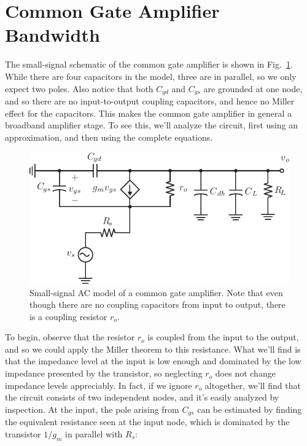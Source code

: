 \section{Common Gate Amplifier Bandwidth}
The small-signal schematic of the common gate amplifier is shown in Fig.~\ref{fig:cg_amp_caps}. While there are four capacitors in the model, three are in parallel, so we only expect two poles.  Also notice that both $C_{gd}$ and $C_{gs}$ are grounded at one node, and so there are no input-to-output coupling capacitors, and hence no Miller effect for the capacitors.  This makes the common gate amplifier in general a broadband amplifier stage.  To see this, we'll analyze the circuit, first using an approximation, and then using the complete equations.  
\begin{figure}[tb]
\centering
\includegraphics[scale=1]{amp_cg_ss}
\caption{Small-signal AC model of a common gate amplifier.  Note that even though there are no coupling capacitors from input to output, there is a coupling resistor $r_o$.}
\label{fig:cg_amp_caps}
\end{figure}
To begin, observe that the resistor $r_o$ is coupled from the input to the output, and so we could apply the Miller theorem to this resistance.  What we'll find is that the impedance level at the input is low enough and dominated by the low impedance presented by the transistor, so neglecting $r_o$ does not change impedance levels appreciably.  In fact, if we ignore $r_o$ altogether, we'll find that the circuit consists of two independent nodes, and it's easily analyzed by inspection.
At the input, the pole arising from $C_{gs}$ can be estimated by finding the equivalent resistance seen at the input node, which is dominated by the transistor $1/g_m$ in parallel with $R_s$:
